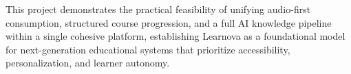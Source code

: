 This project demonstrates the practical feasibility of unifying audio-first
consumption, structured course progression, and a full AI knowledge pipeline
within a single cohesive platform, establishing Learnova as a foundational
model for next-generation educational systems that prioritize accessibility,
personalization, and learner autonomy.

\newpage